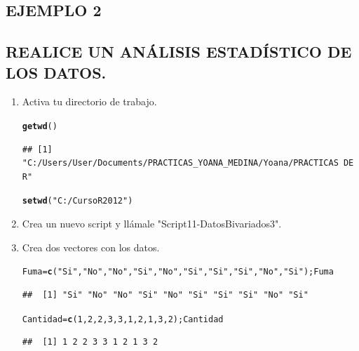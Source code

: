 \documentclass[12pt,letterpaper]{article}\usepackage[]{graphicx}\usepackage[]{color}
\makeatletter
\newcommand{\hlnum}[1]{\textcolor[rgb]{0.686,0.059,0.569}{#1}}%
\newcommand{\hlstr}[1]{\textcolor[rgb]{0.192,0.494,0.8}{#1}}%
\newcommand{\hlstd}[1]{\textcolor[rgb]{0.345,0.345,0.345}{#1}}%
\newcommand{\hlkwb}[1]{\textcolor[rgb]{0.69,0.353,0.396}{#1}}%
\newcommand{\hlkwd}[1]{\textcolor[rgb]{0.737,0.353,0.396}{\textbf{#1}}}%
\newenvironment{kframe}{%
 \def\at@end@of@kframe{}%
 \ifinner\ifhmode%
  \def\at@end@of@kframe{\end{minipage}}%
  \begin{minipage}{\columnwidth}%
 \fi\fi%
 \def\FrameCommand##1{\hskip\@totalleftmargin \hskip-\fboxsep
 \colorbox{shadecolor}{##1}\hskip-\fboxsep
     \hskip-\linewidth \hskip-\@totalleftmargin \hskip\columnwidth}%
 \MakeFramed {\advance\hsize-\width
   \@totalleftmargin\z@ \linewidth\hsize
   \@setminipage}}%
 {\par\unskip\endMakeFramed%
 \at@end@of@kframe}
\newenvironment{knitrout}{}{} %
\makeatother
\begin{document}
\newpage

\subsection*{EJEMPLO 2}

\subsection*{REALICE UN AN\'ALISIS ESTAD\'ISTICO DE LOS DATOS.}

\begin{enumerate}
\item Activa tu directorio de trabajo.

\begin{knitrout}
\color{fgcolor}\begin{kframe}
\begin{alltt}
\hlkwd{getwd}\hlstd{()}
\end{alltt}
\begin{verbatim}
## [1] "C:/Users/User/Documents/PRACTICAS_YOANA_MEDINA/Yoana/PRACTICAS DE R"
\end{verbatim}
\begin{alltt}
\hlkwd{setwd}\hlstd{(}\hlstr{"C:/Curso R2012"}\hlstd{)}
\end{alltt}


{\ttfamily\noindent\bfseries{}}\end{kframe}
\end{knitrout}

\item Crea un nuevo script y llámale "Script11-DatosBivariados3".

\item Crea dos vectores con los datos. 

\begin{knitrout}
\color{fgcolor}\begin{kframe}
\begin{alltt}
\hlstd{Fuma} \hlkwb{=} \hlkwd{c}\hlstd{(}\hlstr{"Si"}\hlstd{,}\hlstr{"No"}\hlstd{,}\hlstr{"No"}\hlstd{,}\hlstr{"Si"}\hlstd{,}\hlstr{"No"}\hlstd{,}\hlstr{"Si"}\hlstd{,}\hlstr{"Si"}\hlstd{,}\hlstr{"Si"}\hlstd{,}\hlstr{"No"}\hlstd{,}\hlstr{"Si"}\hlstd{); Fuma}
\end{alltt}
\begin{verbatim}
##  [1] "Si" "No" "No" "Si" "No" "Si" "Si" "Si" "No" "Si"
\end{verbatim}
\begin{alltt}
\hlstd{Cantidad} \hlkwb{=} \hlkwd{c}\hlstd{(}\hlnum{1}\hlstd{,}\hlnum{2}\hlstd{,}\hlnum{2}\hlstd{,}\hlnum{3}\hlstd{,}\hlnum{3}\hlstd{,}\hlnum{1}\hlstd{,}\hlnum{2}\hlstd{,}\hlnum{1}\hlstd{,}\hlnum{3}\hlstd{,}\hlnum{2}\hlstd{); Cantidad}
\end{alltt}
\begin{verbatim}
##  [1] 1 2 2 3 3 1 2 1 3 2
\end{verbatim}
\end{kframe}
\end{knitrout}


\end{enumerate}
\end{document}
